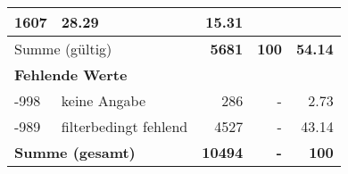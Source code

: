 \begin{longtable}{lXrrr}
       \num{1607} &
       \num[round-mode=places,round-precision=2]{28,29} &
         \num[round-mode=places,round-precision=2]{15,31} \\
     \midrule
     \multicolumn{2}{l}{Summe (gültig)} &
       \textbf{\num{5681}} &
     \textbf{100} &
       \textbf{\num[round-mode=places,round-precision=2]{54,14}} \\
     \multicolumn{5}{l}{\textbf{Fehlende Werte}}\\
       -998 &
       keine Angabe &
         \num{286} &
        - &
         \num[round-mode=places,round-precision=2]{2,73} \\
       -989 &
       filterbedingt fehlend &
         \num{4527} &
        - &
         \num[round-mode=places,round-precision=2]{43,14} \\
     \midrule
     \multicolumn{2}{l}{\textbf{Summe (gesamt)}} &
          \textbf{\num{10494}} &
        \textbf{-} &
        \textbf{100} \\
     \bottomrule
     \end{longtable}
     
